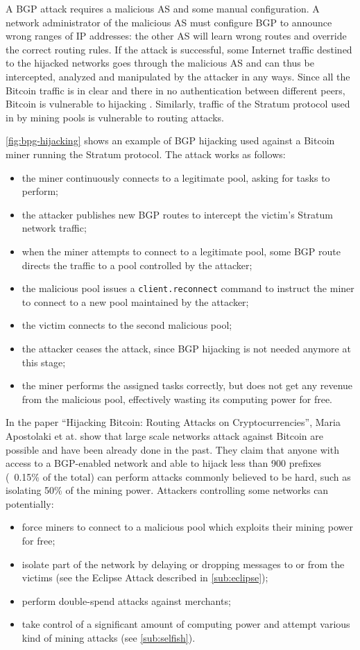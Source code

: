 A \ac{BGP} attack requires a malicious \ac{AS} and some manual configuration.
A network administrator of the malicious \ac{AS} must configure \ac{BGP} to announce wrong ranges of IP addresses:
the other \ac{AS} will learn wrong routes and override the correct routing rules.
If the attack is successful, some Internet traffic destined to the hijacked networks goes through the malicious \ac{AS} and can thus be intercepted, analyzed and manipulated by the attacker in any ways.
Since all the Bitcoin traffic is in clear and there in no authentication between different peers, Bitcoin is vulnerable to hijacking \cite{hijacking_bitcoin_2017}.
Similarly, traffic of the Stratum protocol used in by mining pools is vulnerable to routing attacks.

\bigskip
\cref{fig:bpg-hijacking} shows an example of \ac{BGP} hijacking used against a Bitcoin miner running the Stratum protocol.
The attack works as follows:
\begin{itemize}
	\item the miner continuously connects to a legitimate pool, asking for tasks to perform;
	\item the attacker publishes new \ac{BGP} routes to intercept the victim's Stratum network traffic;
	\item when the miner attempts to connect to a legitimate pool, some \ac{BGP} route directs the traffic to a pool controlled by the attacker;
	\item the malicious pool issues a \texttt{client.reconnect} \cite{stratum_manual} command to instruct the miner to connect to a new pool maintained by the attacker;
	\item the victim connects to the second malicious pool;
	\item the attacker ceases the attack, since \ac{BGP} hijacking is not needed anymore at this stage;
	\item the miner performs the assigned tasks correctly, but does not get any revenue from the malicious pool, effectively wasting its computing power for free.
\end{itemize}

\bigskip
In the paper ``Hijacking Bitcoin: Routing Attacks on Cryptocurrencies'', Maria Apostolaki et at. show that large scale networks attack against Bitcoin are possible and have been already done in the past.
They claim that anyone with access to a BGP-enabled network and able to hijack less than \num{900} prefixes (~\num{0.15}\% of the total) can perform attacks commonly believed to be hard, such as isolating \num{50}\% of the mining power.
Attackers controlling some networks can potentially:
\begin{itemize}
	\item force miners to connect to a malicious pool which exploits their mining power for free;
	\item isolate part of the network by delaying or dropping messages to or from the victims (see the Eclipse Attack described in \cref{sub:eclipse});
	\item perform double-spend attacks against merchants;
	\item take control of a significant amount of computing power and attempt various kind of mining attacks (see \cref{sub:selfish}).
\end{itemize}
